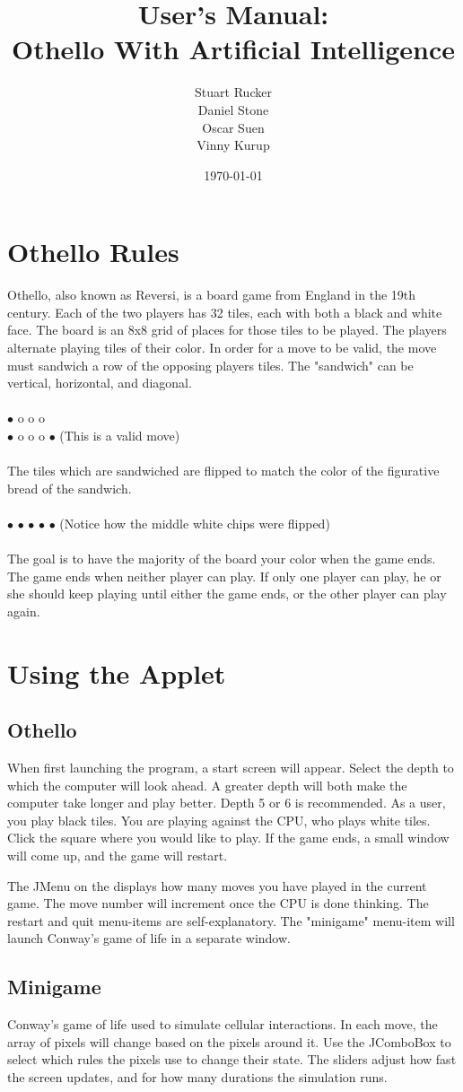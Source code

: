 \documentclass[12pt]{article}
\title{User's Manual: \\ Othello With Artificial Intelligence}
\author{Stuart Rucker \\ Daniel Stone \\ Oscar Suen\\ Vinny Kurup}
\date{\today}
\begin{document}
\maketitle

\section{Othello Rules}
Othello, also known as Reversi, is a board game from England in the 19th century.  Each of the two players has 32 tiles, each with both a black and white face. The board is an 8x8 grid of places for those tiles to be played. The players alternate playing tiles of their color. In order for a move to be valid, the move must sandwich a row of the opposing players tiles. The "sandwich" can be vertical, horizontal, and diagonal.\\\\
$\bullet$ o o o\\
$\bullet$ o o o $\bullet$ (This is a valid move)\\\\
The tiles which are sandwiched are flipped to match the color of the figurative bread of the sandwich.\\\\
$\bullet$ $\bullet$ $\bullet$ $\bullet$ $\bullet$ (Notice how the middle white chips were flipped)\\\\
 The goal is to have the majority of the board your color when the game ends. The game ends when neither player can play. If only one player can play, he or she should keep playing until either the game ends, or the other player can play again. 
\section{Using the Applet}
\subsection{Othello}
When first launching the program, a start screen will appear. Select the depth to which the computer will look ahead. A greater depth will both make the computer take longer and play better. Depth 5 or 6 is recommended. As a user, you play black tiles. You are playing against the CPU, who plays white tiles. Click the square where you would like to play. If the game ends, a small window will come up, and the game will restart. \par
The JMenu  on the displays how many moves you have played in the current game. The move number will increment once the CPU is done thinking. The restart and quit menu-items are self-explanatory. The "minigame" menu-item will launch Conway's game of life in a separate window. 
\subsection{Minigame}
Conway's game of life used to simulate cellular interactions. In each move, the array of pixels will change based on the pixels around it. Use the JComboBox to select which rules the pixels use to change their state. The sliders adjust how fast the screen updates, and for how many durations the simulation runs.
\end{document}
